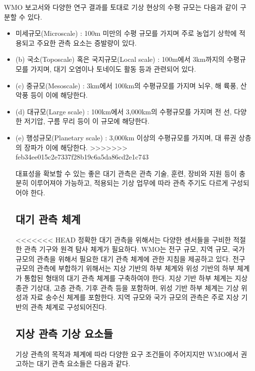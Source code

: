 WMO 보고서와 다양한 연구 결과를 토대로 기상 현상의 수평 규모는 다음과 같이 구분할 수 있다.
\begin{itemize}
	\item 미세규모(Microscale) : 100m 미만의 수평 규모를 가지며 주로 농업기
상학에 적용되고 주요한 관측 요소는 증발량이 있다.
	\item(b) 국소(Toposcale) 혹은 국지규모(Local scale) : 100m에서 3km까지의
수평규모를 가지며, 대기 오염이나 토네이도 활동 등과 관련되어 있다.
	\item(c) 중규모(Mesoscale) : 3km에서 100km의 수평규모를 가지며 뇌우, 해
륙풍, 산악풍 등이 이에 해당한다.
	\item(d) 대규모(Large scale) : 100km에서 3,000km의 수평규모를 가지며 전
선, 다양한 저기압, 구름 무리 등이 이 규모에 해당한다.
	\item(e) 행성규모(Planetary scale) : 3,000km 이상의 수평규모를 가지며, 대
류권 상층의 장파가 이에 해당한다.
>>>>>>> feb34ee015c2e7337f28b19c6a5da86cd2e1c743

대표성을 확보할 수 있는 좋은 대기 관측은 관측 기술, 훈련, 장비와 지원 등이 충분히 이루어져야 가능하고, 적용되는 기상 업무에 따라 관측 주기도 다르게 구성되어야 한다.

\subsection{대기 관측 체계}

<<<<<<< HEAD
정확한 대기 관측을 위해서는 다양한 센서들을 구비한 적절한 관측 기구와 원격 탐사 체계가 필요하다. WMO는 전구 규모, 지역 규모, 국가 규모의 관측을 위해서 필요한 대기 관측  체계에 관한 지침을 제공하고 있다. 전구 규모의 관측에 부합하기 위해서는 지상 기반의 하부 체계와 위성 기반의 하부 체계가 통합된 형태의 대기 관측 체계를 구축하여야 한다. 지상 기반 하부 체계는 지상 종관 기상대, 고층 관측, 기후 관측 등을 포함하며, 위성 기반 하부 체계는 기상 위성과 자료 송수신 체계를 포함한다. 지역 규모와 국가 규모의 관측은 주로 지상 기반의 관측 체계로 구성되어진다. 

\subsection{지상 관측 기상 요소들}

기상 관측의 목적과 체계에 따라 다양한 요구 조건들이 주어지지만 WMO에서 권고하는 대기 관측 요소들은 다음과 같다.


\end{itemize}

